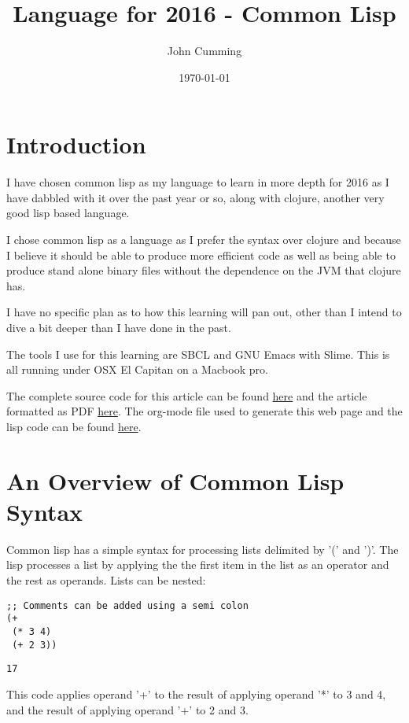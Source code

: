 \documentclass[11pt]{article}
\author{John Cumming}
\date{\today}
\title{Language for 2016 - Common Lisp}
\begin{document}
\maketitle
\tableofcontents


\section{Introduction}
\label{sec-1}

I have chosen common lisp as my language to learn in more depth for
2016 as I have dabbled with it over the past year or so, along with
clojure, another very good lisp based language.

I chose common lisp as a language as I prefer the syntax over
clojure and because I believe it should be able to produce more
efficient code as well as being able to produce stand alone binary
files without the dependence on the JVM that clojure has.

I have no specific plan as to how this learning will pan out, other
than I intend to dive a bit deeper than I have done in the past.

The tools I use for this learning are SBCL and GNU Emacs with
Slime. This is all running under OSX El Capitan on a Macbook pro.

The complete source code for this article can be found \href{2016-lisp.lisp}{here} and the
article formatted as PDF \href{2016-lisp.pdf}{here}. The org-mode file used to generate
this web page and the lisp code can be found \href{2016-lisp.org}{here}.

\section{An Overview of Common Lisp Syntax}
\label{sec-2}

Common lisp has a simple syntax for processing lists delimited by '('
and ')'. The lisp processes a list by applying the the first item in
the list as an operator and the rest as operands. Lists can be
nested:

\begin{verbatim}
;; Comments can be added using a semi colon
(+
 (* 3 4)
 (+ 2 3))
\end{verbatim}
\begin{verbatim}
17
\end{verbatim}

This code applies operand '+' to the result of applying operand '*'
to 3 and 4, and the result of applying operand '+' to 2 and 3.
\end{document}
